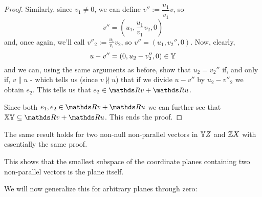 \begin{proof}
	\bigskip
	Similarly, since $v_1\neq 0$, we can define $v'':=\dfrac{u_1}{v_1}v$, so
	\[v''=\left(u_1,\frac{u_1}{v_1}v_2,0\right)\]and, once again, we'll call $v''_2:=\frac{u_1}{v_1}v_2$, so $v''=(u_1,v_2'',0)$. Now, clearly,
	\[u-v''=(0,u_2-v_2'',0)\in\mathbb Y\]and we can, using the same arguments as before, show that $u_2=v_2''$ if, and only if, $v\parallel u$ - which tells us (since $v\nparallel u$) that if we divide $u-v''$ by $u_2-v''_2$ we obtain $e_2$. This tells us that $e_2\in \R v+\R u$.
	
	Since both $e_1,e_2\in\R v+\R u$ we can further see that $\mb{XY}\subseteq \R v +\R u$. This ends the proof.	
\end{proof}

\begin{cor}
	The same result holds for two non-null non-parallel vectors in $\mathbb YZ$ and $\mathbb ZX$ with essentially the same proof.
\end{cor}

\begin{rmk}
	This shows that the smallest subspace of the coordinate planes containing two non-parallel vectors is the plane itself.
	
	We will now generalize this for arbitrary planes through zero:
\end{rmk}

